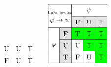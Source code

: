 \documentclass[xcolor=x11names]{beamer}
\begin{document}
\begin{frame}
\[\begin{tikzpicture}[scale=.6]
\node at (1.5,-2.5) {U};
\node at (2.5,-2.5) {U};
\node at (3.5,-2.5) {T};
\node at (1.5,-3.5) {F};
\node at (2.5,-3.5) {U};
\node at (3.5,-3.5) {T};
\end{tikzpicture}
\quad
\begin{tikzpicture}[scale=.6]
\begin{scope}[green]
\fill  (4,-1) rectangle (3,-4);
\fill  (1,-1) rectangle (4,-2);
\fill  (3,-2) rectangle (2,-3);
\end{scope}
\node at (0,0){};
\draw [step=1cm] (-1,-4) node (v1) {} grid (4,1);
\draw[fill=white]  (v1) rectangle (0,-1);
\draw[fill=white]  (-1,1) rectangle (1,-1) node (v2) {};
\draw[fill=white]  (1,1) rectangle (4,0);
\draw[fill=black, opacity=.1]  (v2) node (v3) {} rectangle (4,0);
\draw[fill=black, opacity=.1]  (v3) rectangle (0,-4);
\node at (0,0) {$\begin{array}{c}\textup{\tiny {\L}ukasiewicz}\\ \varphi\to \psi \end{array}$};
\node at (-0.5,-2.5) {$\varphi$};
\node at (2.5,0.5) {$\psi$};
\node at (0.5,-1.5) {F};
\node at (0.5,-2.5) {U};
\node at (0.5,-3.5) {T};
\node at (1.5,-0.5) {F};
\node at (2.5,-0.5) {U};
\node at (3.5,-0.5) {T};
\node at (1.5,-1.5) {T};
\node at (2.5,-1.5) {T};
\node at (3.5,-1.5) {T};
\node at (1.5,-2.5) {U};
\node at (2.5,-2.5) {T};
\node at (3.5,-2.5) {T};
\node at (1.5,-3.5) {F};
\node at (2.5,-3.5) {U};
\node at (3.5,-3.5) {T};
\end{tikzpicture}\]
\end{frame}
\end{document}
